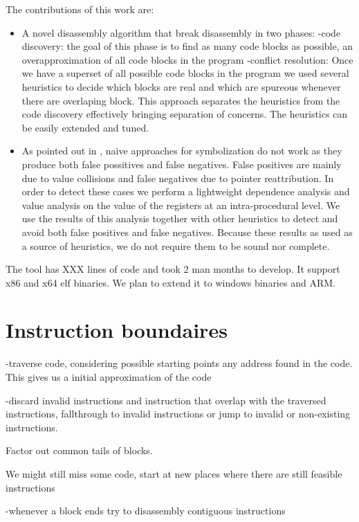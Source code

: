 \documentclass[]{llncs}
\begin{document}
The contributions of this work are:
\begin{itemize}
\item A novel disassembly algorithm that break disassembly in two phases:
  -code discovery: the goal of this phase is to find as many code blocks as possible,
  an overapproximation of all code blocks in the program
  -conflict resolution: Once we have a superset of all possible code blocks in the program
  we used several heuristics to decide which blocks are real and which are spureous
  whenever there are overlaping block.
  This approach separates the heuristics from the code discovery effectively bringing separation
  of concerns. The heuristics can be easily extended and tuned.

\item As pointed out in \cite{Ramblr}, naive approaches for symbolization do not work
  as they produce both false possitives and false negatives.
  False positives are mainly due to value collisions and false negatives due to pointer
  reattribution.
  In order to detect these cases we perform a lightweight dependence analysis and value analysis
  on the value of the registers at an intra-procedural level.
  We use the results of this analysis together with other heuristics to detect and avoid
  both false positives and false negatives. Because these results as used as a source of
  heuristics, we do not require them to be sound nor complete.
\end{itemize}

The tool has XXX lines of code and took 2 man months to develop.
It support x86 and x64 elf binaries. We plan to extend it to
windows binaries and ARM.

\section{Instruction boundaires}
-traverse code, considering possible starting points any address found in the code.
This gives us a initial approximation of the code

-discard invalid instructions and instruction that overlap with the traversed
instructions, fallthrough to invalid instructions or jump to invalid or non-existing
instructions.

Factor out common tails of blocks.

We might still miss some code, start at new places where there are still feasible instructions


-whenever a block ends try to disassembly contiguous instructions
\end{document}
